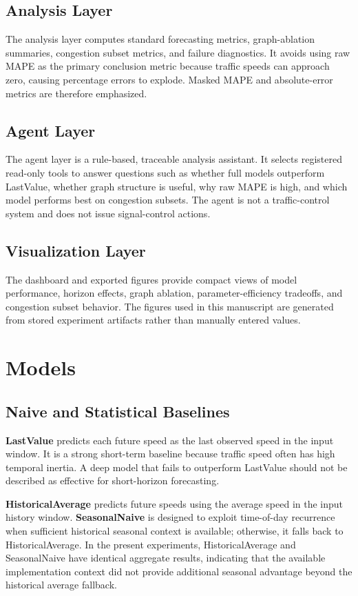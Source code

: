 \documentclass[11pt]{article}
\begin{document}
\subsection{Analysis Layer}
The analysis layer computes standard forecasting metrics, graph-ablation summaries, congestion subset metrics, and failure diagnostics. It avoids using raw MAPE as the primary conclusion metric because traffic speeds can approach zero, causing percentage errors to explode. Masked MAPE and absolute-error metrics are therefore emphasized.

\subsection{Agent Layer}
The agent layer is a rule-based, traceable analysis assistant. It selects registered read-only tools to answer questions such as whether full models outperform LastValue, whether graph structure is useful, why raw MAPE is high, and which model performs best on congestion subsets. The agent is not a traffic-control system and does not issue signal-control actions.

\subsection{Visualization Layer}
The dashboard and exported figures provide compact views of model performance, horizon effects, graph ablation, parameter-efficiency tradeoffs, and congestion subset behavior. The figures used in this manuscript are generated from stored experiment artifacts rather than manually entered values.

\section{Models}
\subsection{Naive and Statistical Baselines}
\textbf{LastValue} predicts each future speed as the last observed speed in the input window. It is a strong short-term baseline because traffic speed often has high temporal inertia. A deep model that fails to outperform LastValue should not be described as effective for short-horizon forecasting.

\textbf{HistoricalAverage} predicts future speeds using the average speed in the input history window. \textbf{SeasonalNaive} is designed to exploit time-of-day recurrence when sufficient historical seasonal context is available; otherwise, it falls back to HistoricalAverage. In the present experiments, HistoricalAverage and SeasonalNaive have identical aggregate results, indicating that the available implementation context did not provide additional seasonal advantage beyond the historical average fallback.
\end{document}
